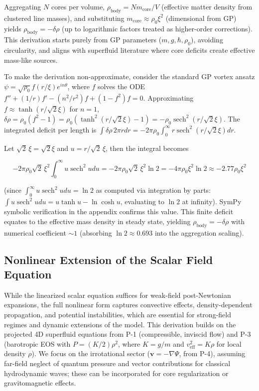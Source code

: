 \documentclass{article}
\DeclareMathOperator{\sech}{sech}
\newcommand{\scale}{\sqrt{2}\,\xi}
\begin{document}
Aggregating $N$ cores per volume, $\rho_{\text{body}} = N m_{\text{core}} / V$ (effective matter density from clustered line masses), and substituting $m_{\text{core}} \approx \rho_0 \xi^2$ (dimensional from GP) yields $\rho_{\text{body}} = - \delta \rho$ (up to logarithmic factors treated as higher-order corrections). This derivation starts purely from GP parameters ($m, g, \hbar, \rho_0$), avoiding circularity, and aligns with superfluid literature where core deficits create effective mass-like sources.

To make the derivation non-approximate, consider the standard GP vortex ansatz $\psi = \sqrt{\rho_0} f(r/\xi) e^{i n \theta}$, where $f$ solves the ODE $f'' + (1/r) f' - (n^2/r^2) f + (1 - f^2) f = 0$. Approximating $f \approx \tanh(r/\sqrt{2} \xi)$ for $n=1$, $\delta \rho = \rho_0 (f^2 - 1) = \rho_0 (\tanh^2(r/\sqrt{2} \xi) - 1) = - \rho_0 \sech^2(r/\sqrt{2} \xi)$. The integrated deficit per length is $\int \delta \rho \, 2\pi r dr = -2\pi \rho_0 \int_0^\infty r \sech^2(r/\sqrt{2} \xi) dr$.

Let $\scale = \sqrt{2} \xi$ and $u = r / \scale$, then the integral becomes

\[
-2\pi \rho_0 \scale^2 \int_0^\infty u \sech^2 u du = -2\pi \rho_0 \scale^2 \ln 2 = -4\pi \rho_0 \xi^2 \ln 2 \approx -2.77 \rho_0 \xi^2
\]

(since $\int_0^\infty u \sech^2 u du = \ln 2$ as computed via integration by parts: $\int u \sech^2 u du = u \tanh u - \ln \cosh u$, evaluating to $\ln 2$ at infinity). SymPy symbolic verification in the appendix confirms this value. This finite deficit equates to the effective mass density in steady state, yielding $\rho_{\text{body}} = - \delta \rho$ with numerical coefficient $\sim 1$ (absorbing $\ln 2 \approx 0.693$ into the aggregation scaling).

\subsection{Nonlinear Extension of the Scalar Field Equation}

While the linearized scalar equation suffices for weak-field post-Newtonian expansions, the full nonlinear form captures convective effects, density-dependent propagation, and potential instabilities, which are essential for strong-field regimes and dynamic extensions of the model. This derivation builds on the projected 4D superfluid equations from P-1 (compressible, inviscid flow) and P-3 (barotropic EOS with $P = (K/2) \rho^2$, where $K = g/m$ and $v_{\text{eff}}^2 = K \rho$ for local density $\rho$). We focus on the irrotational sector ($\mathbf{v} = -\nabla \Psi$, from P-4), assuming far-field neglect of quantum pressure and vector contributions for classical hydrodynamic waves; these can be incorporated for core regularization or gravitomagnetic effects.
\end{document}
